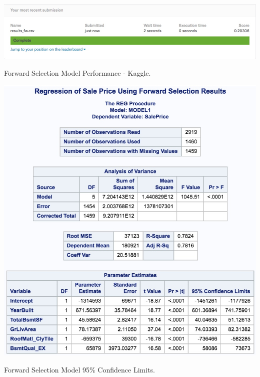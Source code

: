 \documentclass[11pt]{scrartcl} %
\begin{document}
\hrulefill
\begin{table}[H] %
	\centering %
	\includegraphics[scale=.4]{../graphics/A2FWKaggle}
	\caption{Forward Selection Model Performance - Kaggle.}
	\label{tab:A2FWKaggle}
\end{table}
\hrulefill
\begin{table}[H] %
	\centering %
	\includegraphics[scale=.3]{../graphics/A2FWCI}
	\caption{Forward Selection Model 95\% Confidence Limits.}
	\label{tab:A2FWCI}
\end{table}
\hrulefill
\end{document}
